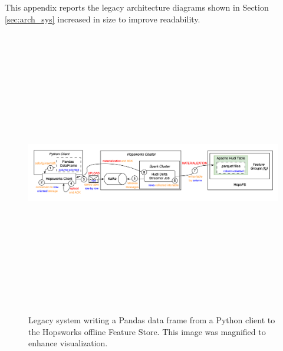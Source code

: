 This appendix reports the legacy architecture diagrams shown in Section \ref{sec:arch_sys} increased in size to improve readability.

\begin{figure}
    \begin{center}
      \includegraphics[angle=90,origin=c,keepaspectratio,height=12.5cm]{figures/2-background/FeatureStore-writing.png}
    \end{center}
    \caption[Legacy system - Write process - Magnified diagram]{Legacy system writing a Pandas data frame from a Python client to the Hopsworks offline Feature Store.  This image was magnified to enhance visualization.}
    \label{fig:appx_featurestore_writing}
\end{figure}


